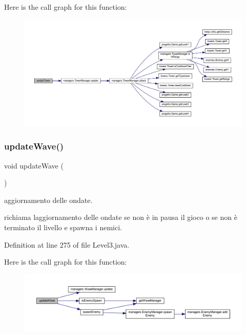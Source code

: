 Here is the call graph for this function\+:\nopagebreak
\begin{figure}[H]
\begin{center}
\leavevmode
\includegraphics[width=350pt]{classscenes_1_1_level3_ae4fd4a959e4d782a5e7ac0eff77ba27f_cgraph}
\end{center}
\end{figure}
\mbox{\label{classscenes_1_1_level3_ab424ab29e7ab4733f2efd1e6ef3f13b1}} 
\subsubsection{\texorpdfstring{update\+Wave()}{updateWave()}}
{\footnotesize\ttfamily void update\+Wave (\begin{DoxyParamCaption}{ }\end{DoxyParamCaption})}



aggiornamento delle ondate. 

richiama l\textquotesingle{}aggiornamento delle ondate se non è in pausa il gioco o se non è terminato il livello e spawna i nemici. 

Definition at line 275 of file Level3.\+java.

Here is the call graph for this function\+:\nopagebreak
\begin{figure}[H]
\begin{center}
\leavevmode
\includegraphics[width=350pt]{classscenes_1_1_level3_ab424ab29e7ab4733f2efd1e6ef3f13b1_cgraph}
\end{center}
\end{figure}


